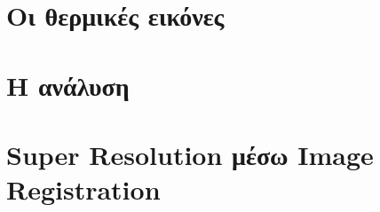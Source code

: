 \documentclass[a4paper,11pt,twoside]{book}
\author{\me}
\begin{document}
\setcounter{page}{3}



\clearemptydoublepage



\clearemptydoublepage



\clearemptydoublepage



\clearemptydoublepage



\clearemptydoublepage

\pagestyle{fancy}

\tableofcontents
\clearemptydoublepage

\setcounter{page}{1}


\clearemptydoublepage

\chapter{Οι θερμικές εικόνες}\label{ch:chap1}

\clearemptydoublepage

\chapter{Η ανάλυση}\label{ch:chap2}

\clearemptydoublepage

\chapter{Super Resolution μέσω Image Registration}\label{ch:chap3}

\clearemptydoublepage


\clearemptydoublepage


\end{document}
